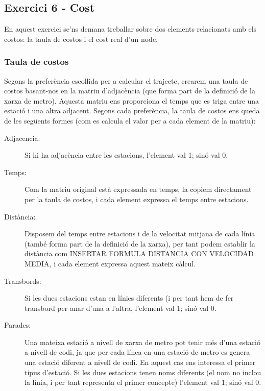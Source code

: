 \documentclass[a4paper,12pt]{article}
\begin{document}

        \subsection{Exercici 6 - Cost}

        En aquest exercici se'ns demana treballar sobre dos elements relacionats amb els costos: la taula de costos i el cost real d’un node.
        
            \subsubsection{Taula de costos}

                Segons la preferència escollida per a calcular el trajecte, crearem una taula de costos basant-nos en la matriu d’adjacència (que forma part de la definició de la xarxa de metro). Aquesta matriu ens proporciona el temps que es triga entre una estació i una altra adjacent.
                Segons cada preferència, la taula de costos ens queda de les següents formes (com es calcula el valor per a cada element de la matriu):
                \begin{description}
                    \item[Adjacencia:] Si hi ha adjacència entre les estacions, l’element val 1; sinó val 0.
                    \item[Temps:] Com la matriu original està expressada en temps, la copiem directament per la taula de costos, i cada element expressa el temps entre estacions.
                    \item[Distància:] Disposem del temps entre estacions i de la velocitat mitjana de cada línia (també forma part de la definició de la xarxa), per tant podem establir la distància com INSERTAR FORMULA DISTANCIA CON VELOCIDAD MEDIA, i cada element expressa aquest mateix càlcul.
                    \item[Transbords:] Si les dues estacions estan en línies diferents (i per tant hem de fer transbord per anar d’una a l’altra, l’element val 1; sinó val 0.
                    \item[Parades:] Una mateixa estació a nivell de xarxa de metro pot tenir més d’una estació a nivell de codi, ja que per cada línea en una estació de metro es genera una estació diferent a nivell de codi. En aquest cas ens interessa el primer tipus d’estació. Si les dues estacions tenen noms diferents (el nom no inclou la línia, i per tant representa el primer concepte) l’element val 1; sinó val 0. 
                \end{description}
            
\end{document}
